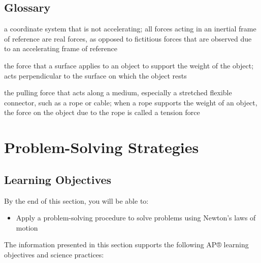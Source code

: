 \documentclass[
]{book}
\providecommand{\tightlist}{%
  \setlength{\itemsep}{0pt}\setlength{\parskip}{0pt}}
\begin{document}
\hypertarget{glossary-15}{%
\subsection{Glossary}\label{glossary-15}}

\begin{description}
\tightlist
\item[inertial frame of reference]
a coordinate system that is not accelerating; all forces acting in
an inertial frame of reference are real forces, as opposed to
fictitious forces that are observed due to an accelerating frame of
reference
\end{description}

\begin{description}
\tightlist
\item[normal force]
the force that a surface applies to an object to support the weight
of the object; acts perpendicular to the surface on which the object
rests
\end{description}

\begin{description}
\tightlist
\item[tension]
the pulling force that acts along a medium, especially a stretched
flexible connector, such as a rope or cable; when a rope supports
the weight of an object, the force on the object due to the rope is
called a tension force
\end{description}

\hypertarget{problem-solving-strategies}{%
\section{Problem-Solving Strategies}\label{problem-solving-strategies}}

\hypertarget{fs-id1795639}{}
\hypertarget{learning-objectives-17}{%
\subsection{Learning Objectives}\label{learning-objectives-17}}

By the end of this section, you will be able to:

\begin{itemize}
\tightlist
\item
  Apply a problem-solving procedure to solve problems using Newton's
  laws of motion
\end{itemize}

The information presented in this section supports the following AP®
learning objectives and science practices:
\end{document}
